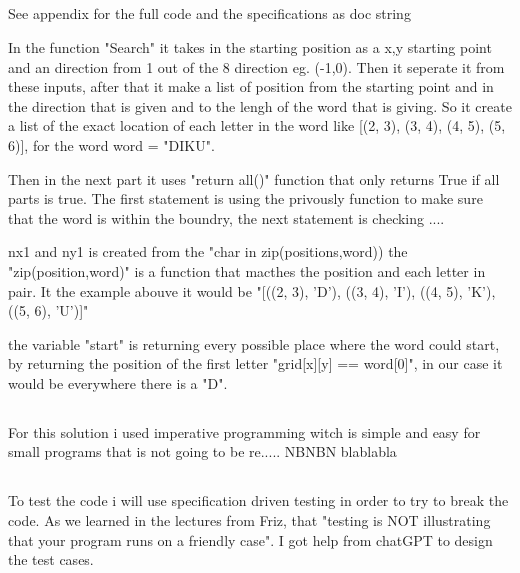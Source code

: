 \documentclass{article}
\begin{document}
\subsection{}

See appendix for the full code and the specifications as doc string




In the function "Search" it takes in the starting position as a x,y starting point and an direction from 1 out of the 8 direction eg. (-1,0). Then it seperate it from these inputs, after that it make a list of position from the starting point and in the direction that is given and to the lengh of the word that is giving. So it create a list of the exact location of each letter in the word like [(2, 3), (3, 4), (4, 5), (5, 6)], for the word word = "DIKU".

Then in the next part it uses "return all()" function that only returns True if all parts is true. The first statement is using the privously function to make sure that the word is within the boundry, the next statement is checking ....

nx1 and ny1 is created from the "char in zip(positions,word)) the "zip(position,word)" is a function that macthes the position and each letter in pair. It the example abouve it would be "[((2, 3), 'D'), ((3, 4), 'I'), ((4, 5), 'K'), ((5, 6), 'U')]"


the variable "start" is returning every possible place where the word could start, by returning the position of the first letter "grid[x][y] == word[0]", in our case it would be everywhere there is a "D".




\subsection{}


For this solution i used imperative programming witch is simple and easy for small programs that is not going to be re..... NBNBN blablabla




\subsection{}




To test the code i will use specification driven testing in order to try to break the code. As we learned in the lectures from Friz, that "testing is NOT illustrating that your program runs on a friendly case". I got help from chatGPT to design the test cases.
\end{document}
